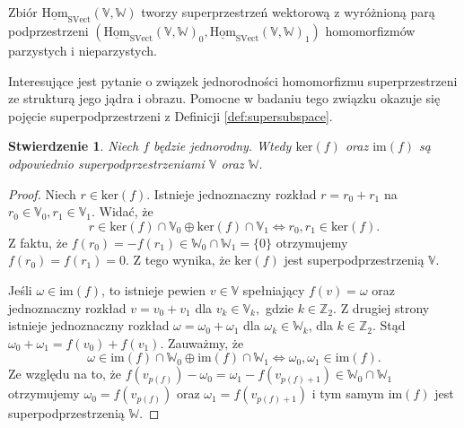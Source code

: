 \documentclass[11pt,a4paper]{report}
\newtheorem{proposition}[theorem]{Stwierdzenie}
\theoremstyle{definition}
\begin{document}
Zbiór $\underline{\mathrm{Hom}}_{\mathrm{SVect}}(\mathbb{V},\mathbb{W})$ tworzy superprzestrzeń wektorową z wyróżnioną parą podprzestrzeni $(\underline{\mathrm{Hom}}_{\mathrm{SVect}}(\mathbb{V},\mathbb{W})_0,\underline{\mathrm{Hom}}_{\mathrm{SVect}}(\mathbb{V},\mathbb{W})_1)$ homomorfizmów parzystych i nieparzystych.

Interesujące jest pytanie o związek jednorodności homomorfizmu superprzestrzeni ze strukturą jego jądra i obrazu. Pomocne w badaniu tego związku okazuje się pojęcie superpodprzestrzeni z Definicji \ref{def:supersubspace}.

\begin{proposition}
\label{homogeneous_morphism_decomposition}
 Niech $f$ będzie jednorodny. Wtedy $\textrm{ker}(f)$ oraz $\textrm{im}(f)$ są odpowiednio superpodprzestrzeniami $\mathbb{V}$ oraz $\mathbb{W}$.
\end{proposition}

\begin{proof}
 Niech $r \in \textrm{ker}(f)$. Istnieje jednoznaczny rozkład $r = r_0 + r_1$ na $r_0 \in \mathbb{V}_0, r_1 \in \mathbb{V}_1$. Widać, że
 $$r \in\textrm{ker}(f) \cap \mathbb{V}_0 \oplus \textrm{ker}(f) \cap \mathbb{V}_1 \iff r_0, r_1 \in \textrm{ker}(f).$$
 Z faktu, że $f(r_0) = -f(r_1) \in \mathbb{W}_0\cap \mathbb{W}_1 = \{ 0 \}$ otrzymujemy $f(r_0) = f(r_1) = 0$. Z tego wynika, że $\textrm{ker}(f)$ jest superpodprzestrzenią  $\mathbb{V}$.
 
 Jeśli $\omega \in \textrm{im}(f)$, to istnieje pewien $v \in \mathbb{V}$ spełniający $f(v) = \omega$ oraz jednoznaczny rozkład $v = v_0 + v_1$ dla $v_k \in \mathbb{V}_k,$ gdzie $k \in \mathbb{Z}_2$. Z drugiej strony istnieje jednoznaczny rozkład $\omega = \omega_0+\omega_1$ dla $\omega_k \in \mathbb{W}_k$, dla $k \in \mathbb{Z}_2$. Stąd $\omega_0 + \omega_1 = f(v_0) + f(v_1)$. Zauważmy, że
 $$\omega \in\textrm{im}(f) \cap \mathbb{W}_0 \oplus \textrm{im}(f) \cap \mathbb{W}_1 \iff \omega_0, \omega_1 \in \textrm{im}(f).$$
 Ze względu na to, że $f(v_{p(f)}) - \omega_0 = \omega_1 - f(v_{p(f)+1}) \in \mathbb{W}_0 \cap \mathbb{W}_1$ otrzymujemy $\omega_0 = f(v_{p(f)})$ oraz $\omega_1 = f(v_{p(f)+1})$ i tym samym $\mathrm{im}(f)$ jest superpodprzestrzenią $\mathbb{W}$.
\end{proof}
\end{document}
